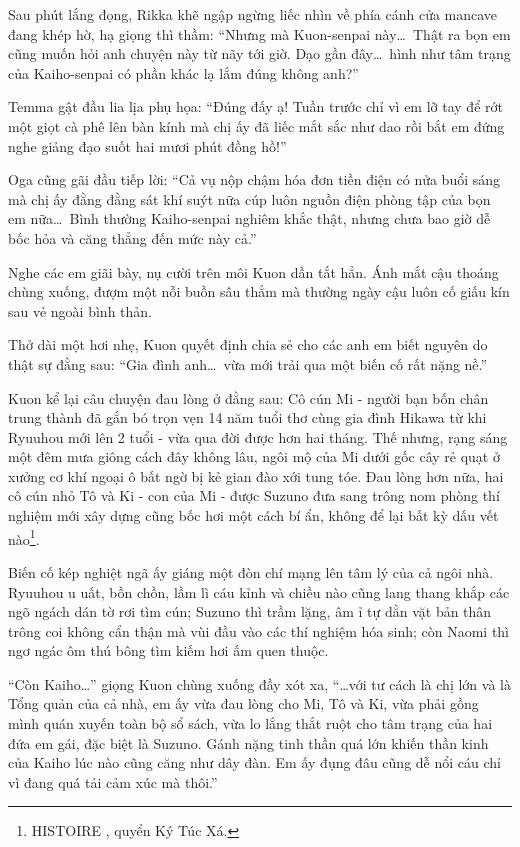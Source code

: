 \documentclass[../main.tex]{subfiles}
\begin{document}
Sau phút lắng đọng, Rikka khẽ ngập ngừng liếc nhìn về phía cánh cửa mancave đang khép hờ, hạ giọng thì thầm: ``Nhưng mà Kuon-senpai này\dots\ Thật ra bọn em cũng muốn hỏi anh chuyện này từ nãy tới giờ. Dạo gần đây\dots\ hình như tâm trạng của Kaiho-senpai có phần khác lạ lắm đúng không anh?''

Temma gật đầu lia lịa phụ họa: ``Đúng đấy ạ! Tuần trước chỉ vì em lỡ tay để rớt một giọt cà phê lên bàn kính mà chị ấy đã liếc mắt sắc như dao rồi bắt em đứng nghe giảng đạo suốt hai mươi phút đồng hồ!''

Oga cũng gãi đầu tiếp lời: ``Cả vụ nộp chậm hóa đơn tiền điện có nửa buổi sáng mà chị ấy đằng đằng sát khí suýt nữa cúp luôn nguồn điện phòng tập của bọn em nữa\dots\ Bình thường Kaiho-senpai nghiêm khắc thật, nhưng chưa bao giờ dễ bốc hỏa và căng thẳng đến mức này cả.''

Nghe các em giãi bày, nụ cười trên môi Kuon dần tắt hẳn. Ánh mắt cậu thoáng chùng xuống, đượm một nỗi buồn sâu thẳm mà thường ngày cậu luôn cố giấu kín sau vẻ ngoài bình thản.

Thở dài một hơi nhẹ, Kuon quyết định chia sẻ cho các anh em biết nguyên do thật sự đằng sau: ``Gia đình anh\dots\ vừa mới trải qua một biến cố rất nặng nề.''

Kuon kể lại câu chuyện đau lòng ở đằng sau: Cô cún Mi - người bạn bốn chân trung thành đã gắn bó trọn vẹn 14 năm tuổi thơ cùng gia đình Hikawa từ khi Ryuuhou mới lên 2 tuổi - vừa qua đời được hơn hai tháng. Thế nhưng, rạng sáng một đêm mưa giông cách đây không lâu, ngôi mộ của Mi dưới gốc cây rẻ quạt ở xưởng cơ khí ngoại ô bất ngờ bị kẻ gian đào xới tung tóe. Đau lòng hơn nữa, hai cô cún nhỏ Tô và Ki - con của Mi - được Suzuno đưa sang trông nom phòng thí nghiệm mới xây dựng cũng bốc hơi một cách bí ẩn, không để lại bất kỳ dấu vết nào\footnote{{\flaregothic HISTOIRE }, quyển Ký Túc Xá.}.

Biến cố kép nghiệt ngã ấy giáng một đòn chí mạng lên tâm lý của cả ngôi nhà. Ryuuhou u uất, bồn chồn, lầm lì cáu kỉnh và chiều nào cũng lang thang khắp các ngõ ngách dán tờ rơi tìm cún; Suzuno thì trầm lặng, âm ỉ tự dằn vặt bản thân trông coi không cẩn thận mà vùi đầu vào các thí nghiệm hóa sinh; còn Naomi thì ngơ ngác ôm thú bông tìm kiếm hơi ấm quen thuộc.

``Còn Kaiho\dots'' giọng Kuon chùng xuống đầy xót xa, ``\dots với tư cách là chị lớn và là Tổng quản của cả nhà, em ấy vừa đau lòng cho Mi, Tô và Ki, vừa phải gồng mình quán xuyến toàn bộ sổ sách, vừa lo lắng thắt ruột cho tâm trạng của hai đứa em gái, đặc biệt là Suzuno. Gánh nặng tinh thần quá lớn khiến thần kinh của Kaiho lúc nào cũng căng như dây đàn. Em ấy đụng đâu cũng dễ nổi cáu chỉ vì đang quá tải cảm xúc mà thôi.''
\end{document}
